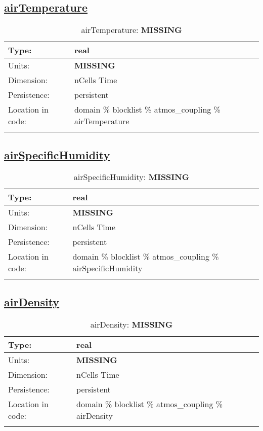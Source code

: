\subsection[airTemperature]{\hyperref[sec:var_tab_atmos_coupling]{airTemperature}}
\label{subsec:var_sec_atmos_coupling_airTemperature}
\begin{center}
\begin{longtable}{| p{2.0in} | p{4.0in} |}
        \hline 
        Type: & real \\
        \hline 
        Units: & {\bf \color{red} MISSING} \\
        \hline 
        Dimension: & nCells Time \\
        \hline 
        Persistence: & persistent \\
        \hline 
         Location in code: & domain \% blocklist \% atmos\_coupling \% airTemperature \\
         \hline 
    \caption{airTemperature: {\bf \color{red} MISSING}}
\end{longtable}
\end{center}
\subsection[airSpecificHumidity]{\hyperref[sec:var_tab_atmos_coupling]{airSpecificHumidity}}
\label{subsec:var_sec_atmos_coupling_airSpecificHumidity}
\begin{center}
\begin{longtable}{| p{2.0in} | p{4.0in} |}
        \hline 
        Type: & real \\
        \hline 
        Units: & {\bf \color{red} MISSING} \\
        \hline 
        Dimension: & nCells Time \\
        \hline 
        Persistence: & persistent \\
        \hline 
         Location in code: & domain \% blocklist \% atmos\_coupling \% airSpecificHumidity \\
         \hline 
    \caption{airSpecificHumidity: {\bf \color{red} MISSING}}
\end{longtable}
\end{center}
\subsection[airDensity]{\hyperref[sec:var_tab_atmos_coupling]{airDensity}}
\label{subsec:var_sec_atmos_coupling_airDensity}
\begin{center}
\begin{longtable}{| p{2.0in} | p{4.0in} |}
        \hline 
        Type: & real \\
        \hline 
        Units: & {\bf \color{red} MISSING} \\
        \hline 
        Dimension: & nCells Time \\
        \hline 
        Persistence: & persistent \\
        \hline 
         Location in code: & domain \% blocklist \% atmos\_coupling \% airDensity \\
         \hline 
    \caption{airDensity: {\bf \color{red} MISSING}}
\end{longtable}
\end{center}
